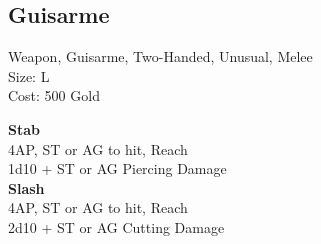 \subsection{Guisarme}\label{weapon:guisarme}
Weapon, Guisarme, Two-Handed, Unusual, Melee\\
Size: L\\
Cost: 500 Gold

\textbf{Stab}\\
4AP, ST or AG to hit,  Reach\\
1d10 + \texttimes ST or AG Piercing Damage\\

\textbf{Slash}\\
4AP, ST or AG to hit,  Reach\\
2d10 + \texttimes ST or AG Cutting Damage\\
